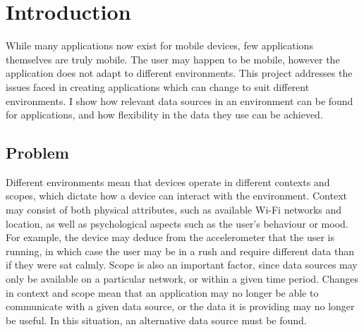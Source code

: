 \documentclass[12pt,twoside,notitlepage]{report}
\begin{document}
\bigskip
{}

\cleardoublepage

\tableofcontents

\listoffigures

\newpage


\cleardoublepage        %

\setcounter{page}{1}
\pagestyle{headings}

\chapter{Introduction}

While many applications now exist for mobile devices, few applications themselves are truly mobile. 
The user may happen to be mobile, however the application does not adapt to different environments. 
This project addresses the issues faced in creating applications which can change to suit different environments. 
I show how relevant data sources in an environment can be found for applications, and how flexibility in the data they use can be achieved. 

\section{Problem}
Different environments mean that devices operate in different contexts and scopes, which dictate how a device can interact with the environment. 
Context may consist of both physical attributes, such as available Wi-Fi networks and location, as well as psychological aspects such as the user's behaviour or mood.
For example, the device may deduce from the accelerometer that the user is running, in which case the user may be in a rush and require different data than if they were sat calmly.
Scope is also an important factor, since data sources may only be available on a particular network, or within a given time period. 
Changes in context and scope mean that an application may no longer be able to communicate with a given data source, or the data it is providing may no longer be useful. 
In this situation, an alternative data source must be found.
\end{document}
